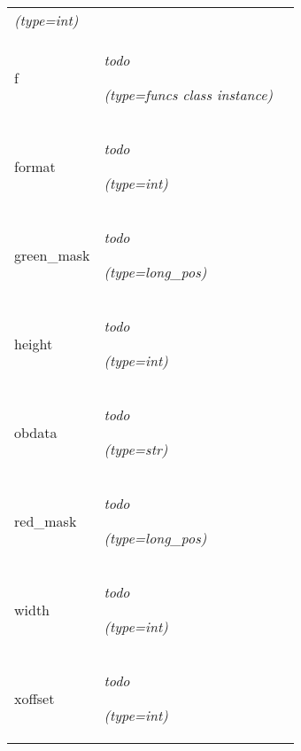 \begin{longtable}{|p{\varnamewidth}|p{\vardescrwidth}|l}
            {\it (type=int)}&\\
\cline{1-2}
\raggedright f\- & \raggedright \emph{todo}

            {\it (type=funcs class instance)}&\\
\cline{1-2}
\raggedright f\-o\-r\-m\-a\-t\- & \raggedright \emph{todo}

            {\it (type=int)}&\\
\cline{1-2}
\raggedright g\-r\-e\-e\-n\-\_\-m\-a\-s\-k\- & \raggedright \emph{todo}

            {\it (type=long\_pos)}&\\
\cline{1-2}
\raggedright h\-e\-i\-g\-h\-t\- & \raggedright \emph{todo}

            {\it (type=int)}&\\
\cline{1-2}
\raggedright o\-b\-d\-a\-t\-a\- & \raggedright \emph{todo}

            {\it (type=str)}&\\
\cline{1-2}
\raggedright r\-e\-d\-\_\-m\-a\-s\-k\- & \raggedright \emph{todo}

            {\it (type=long\_pos)}&\\
\cline{1-2}
\raggedright w\-i\-d\-t\-h\- & \raggedright \emph{todo}

            {\it (type=int)}&\\
\cline{1-2}
\raggedright x\-o\-f\-f\-s\-e\-t\- & \raggedright \emph{todo}

            {\it (type=int)}&\\
\cline{1-2}
\end{longtable}

